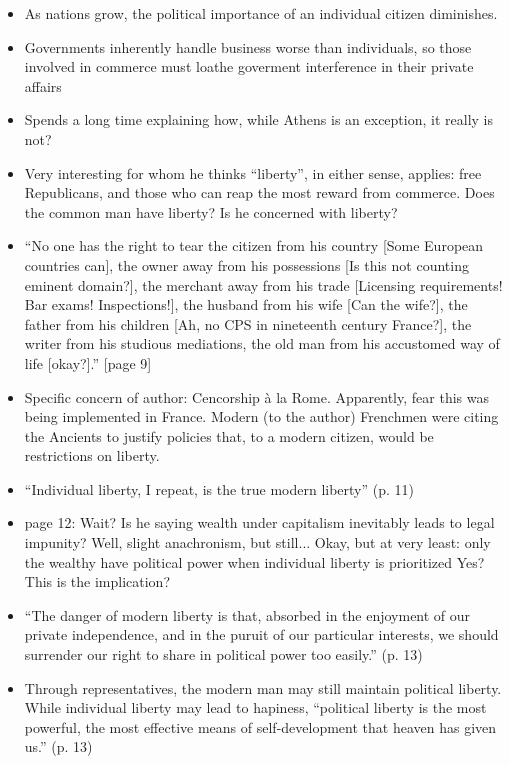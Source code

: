 \documentclass[11pt]{article}
\newcommand{\question}[1]{{\color{BurntOrange}#1}}
\newcommand{\comment}[1]{{\color{Cerulean}#1}}
\begin{document}
\begin{itemize}
\item As nations grow, the political importance of an individual citizen
diminishes.

\item Governments inherently handle business worse than individuals, 
so those involved in commerce must loathe goverment interference in
their private affairs

\item Spends a long time explaining how, while Athens is an exception,
it really is not?

\item Very interesting for whom he thinks ``liberty'', in either sense,
applies: free Republicans, and those who can reap the most reward from
commerce. 
\comment{Does the common man have liberty? Is he concerned with liberty?}

\item 
``No one has the right to tear the citizen from his country 
\comment{[Some European countries can]}, the owner away from
his possessions \comment{[Is this not counting eminent domain?]},
the merchant away from his trade \comment{[Licensing requirements!
Bar exams! Inspections!]}, the husband from his wife \comment{[Can the 
wife?]}, the father from his children \comment{[Ah, no CPS in 
nineteenth century France?]}, the writer from his studious mediations,
the old man from his accustomed way of life \comment{[okay?]}.'' [page 9]

\item Specific concern of author: Cencorship \`{a} la Rome. Apparently, fear
this was being implemented in France. Modern (to the author) Frenchmen 
were citing the Ancients to justify policies that, to a modern 
citizen, would be restrictions on liberty. 

\item ``Individual liberty, I repeat, is the true modern liberty'' (p. 11)

\item page 12: \question{Wait? Is he saying wealth under capitalism 
inevitably leads to legal impunity? Well, slight anachronism, but
still...} Okay, but at very least: only the wealthy have political
power when individual liberty is prioritized \question{Yes? This
is the implication?}

\item ``The danger of modern liberty is that, absorbed in the enjoyment
of our private independence, and in the puruit of our particular interests,
we should surrender our right to share in political power too easily.'' 
(p. 13) 

\item Through representatives, the modern man may still maintain 
political liberty. While individual liberty may lead to hapiness,
``political liberty is the most powerful, the most effective means
of self-development that heaven has given us.'' (p. 13) 


\end{itemize}
\end{document}
